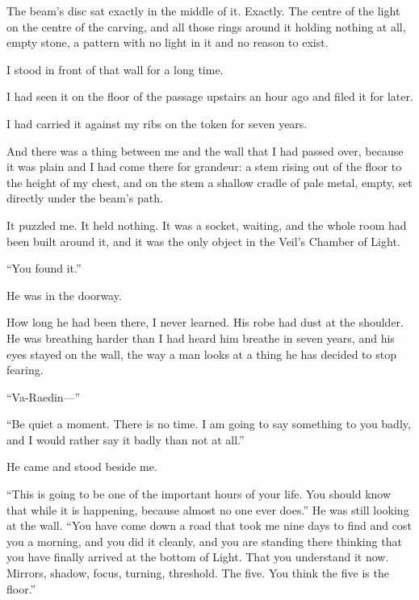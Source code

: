 The beam's disc sat exactly in the middle of it. Exactly. The centre of the light on the centre of the carving, and all those rings around it holding nothing at all, empty stone, a pattern with no light in it and no reason to exist.\par

I stood in front of that wall for a long time.\par

I had seen it on the floor of the passage upstairs an hour ago and filed it for later.\par

I had carried it against my ribs on the token for seven years.\par

And there was a thing between me and the wall that I had passed over, because it was plain and I had come there for grandeur: a stem rising out of the floor to the height of my chest, and on the stem a shallow cradle of pale metal, empty, set directly under the beam's path.\par

It puzzled me. It held nothing. It was a socket, waiting, and the whole room had been built around it, and it was the only object in the Veil's Chamber of Light.\par

\ornament

``You found it.''\par

He was in the doorway.\par

How long he had been there, I never learned. His robe had dust at the shoulder. He was breathing harder than I had heard him breathe in seven years, and his eyes stayed on the wall, the way a man looks at a thing he has decided to stop fearing.\par

``Va-Raedin---''\par

``Be quiet a moment. There is no time. I am going to say something to you badly, and I would rather say it badly than not at all.''\par

He came and stood beside me.\par

``This is going to be one of the important hours of your life. You should know that while it is happening, because almost no one ever does.'' He was still looking at the wall. ``You have come down a road that took me nine days to find and cost you a morning, and you did it cleanly, and you are standing there thinking that you have finally arrived at the bottom of Light. That you understand it now. Mirrors, shadow, focus, turning, threshold. The five. You think the five is the floor.''\par

